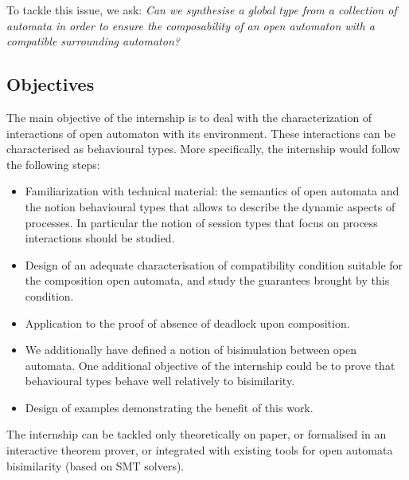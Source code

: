 \documentclass[11pt,fleqn]{article}
\begin{document}
 
To tackle this issue, we ask: { \it Can we synthesise a global type from a collection of automata in order to ensure the composability of an open automaton  with a compatible  surrounding automaton? }



\subsection*{Objectives}

The main objective of the internship is to deal with the characterization of interactions  of open automaton with its environment. These interactions can be characterised as behavioural types.
More specifically, the internship would follow the following steps:
\begin{itemize}
\item Familiarization with technical material: the semantics of  open automata and the notion behavioural types \cite{Hans:2016} that allows to describe the dynamic aspects of processes. In particular the notion of session types that focus on process interactions should be studied.

\item Design of an adequate characterisation of  compatibility condition  suitable for the composition open automata, and study the guarantees brought by this condition. 

\item Application to the proof of absence of deadlock upon composition.

\item  We additionally have defined a notion of bisimulation between open automata. One additional objective of the internship could be to prove that behavioural types behave well relatively to bisimilarity.

\item Design of examples demonstrating the benefit of this work.

\end{itemize}

The internship can be tackled only theoretically on paper, or formalised in an interactive theorem prover, or integrated with existing tools for open automata bisimilarity (based on SMT solvers).
 
\end{document}
